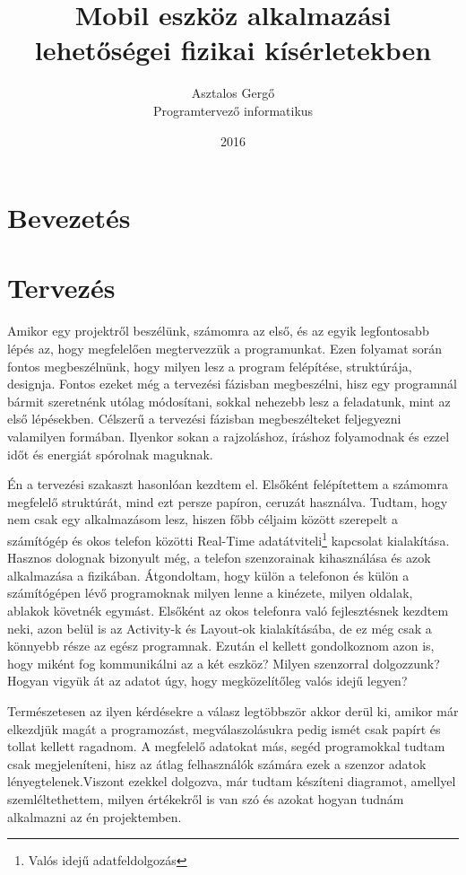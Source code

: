 \documentclass{thesis-ekf}
\institute{Eszterházy Károly Főiskola\\ Matematikai és Informatikai Intézet}
\title{Mobil eszköz alkalmazási lehetőségei fizikai kísérletekben}
\author{Asztalos Gergő\\ Programtervező informatikus}
\date{2016}
\theoremstyle{definition}
\theoremstyle{remark}
\begin{document}
\maketitle
\tableofcontents

\chapter*{Bevezetés}

\chapter{Tervezés}
	Amikor egy projektről beszélünk, számomra az első, és az egyik legfontosabb lépés az, hogy megfelelően megtervezzük a programunkat. Ezen folyamat során fontos megbeszélnünk, hogy milyen lesz a program felépítése, struktúrája, designja. Fontos ezeket még a tervezési fázisban megbeszélni, hisz egy programnál bármit szeretnénk utólag módosítani, sokkal nehezebb lesz a feladatunk, mint az első lépésekben. Célszerű a tervezési fázisban megbeszélteket feljegyezni valamilyen formában. Ilyenkor sokan a rajzoláshoz, íráshoz folyamodnak és ezzel időt és energiát spórolnak maguknak.
	\par Én a tervezési szakaszt hasonlóan kezdtem el. Elsőként felépítettem a számomra megfelelő struktúrát, mind ezt persze papíron, ceruzát használva. Tudtam, hogy nem csak egy alkalmazásom lesz, hiszen főbb céljaim között szerepelt a számítógép és okos telefon közötti Real-Time adatátviteli\footnote{Valós idejű adatfeldolgozás} kapcsolat kialakítása. Hasznos dolognak bizonyult még, a telefon szenzorainak kihasználása és azok alkalmazása a fizikában. Átgondoltam, hogy külön a telefonon és külön a számítógépen lévő programoknak milyen lenne a kinézete, milyen oldalak, ablakok követnék egymást. Elsőként az okos telefonra való fejlesztésnek kezdtem neki, azon belül is az Activity-k és Layout-ok kialakításába, de ez még csak a könnyebb része az egész programnak. Ezután el kellett gondolkoznom azon is, hogy miként fog kommunikálni az a két eszköz? Milyen szenzorral dolgozzunk? Hogyan vigyük át az adatot úgy, hogy megközelítőleg valós idejű legyen?
	\par Természetesen az ilyen kérdésekre a válasz legtöbbször akkor derül ki, amikor már elkezdjük magát a programozást, megválaszolásukra pedig ismét csak papírt és tollat kellett ragadnom. A megfelelő adatokat más, segéd programokkal tudtam csak megjeleníteni, hisz az átlag felhasználók számára ezek a szenzor adatok lényegtelenek.Viszont ezekkel dolgozva, már tudtam készíteni diagramot, amellyel szemléltethettem, milyen értékekről is van szó és azokat hogyan tudnám alkalmazni az én projektemben.
\end{document}
